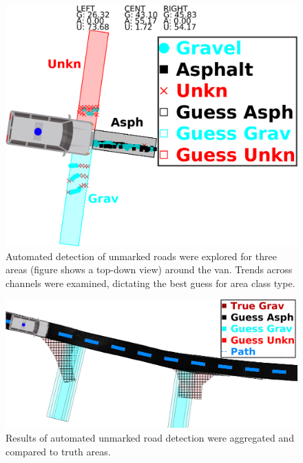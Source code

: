 \documentclass[numbered,pdftex]{ohio-etd}
\begin{document}
{{		\begin{figure}[H]
			\centering
			\includegraphics[width=0.9\linewidth]{Defense_Images/auto_area_guess}
			\caption[Projected Automated Guess vs Truth]{Automated detection of unmarked roads were explored for three areas (figure shows a top-down view) around the van. Trends across channels were examined, dictating the best guess for area class type. }
			\label{fig:auto_guess_areas}
		\end{figure}
		
		\begin{figure}[H]
			\centering
			\includegraphics[width=0.9\linewidth]{Defense_Images/auto_guess_v_truth}
			\caption[Projected Automated Guess vs Truth]{Results of automated unmarked road detection were aggregated and compared to truth areas.}
			\label{fig:auto_guess_v_truth}
		\end{figure}	
		
	}
		


\newpage
	
}
\end{document}

